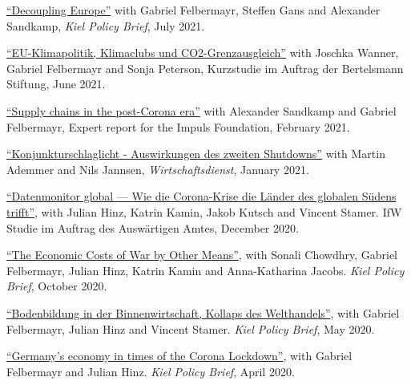 \documentclass{article}
\newlength{\cvlabelwidth}\setlength{\cvlabelwidth}{0.12\textwidth}
\newlength{\cvlabelgap}\setlength{\cvlabelgap}{5mm}
\newcommand{\cvmakelabel}[1]{%
    \smash{\parbox[t]{\cvlabelwidth}{\raggedright{\fontfamily{phv}\selectfont #1}}}}
\newenvironment{cvsection}[1]{%
    \par\medskip
    \begin{list}{}{%
        \setlength{\leftmargin}{\dimexpr\cvlabelwidth+\cvlabelgap\relax}%
        \setlength{\labelwidth}{\cvlabelwidth}%
        \setlength{\labelsep}{\cvlabelgap}%
        \setlength{\rightmargin}{0pt}%
        \setlength{\itemindent}{0pt}%
        \setlength{\listparindent}{0pt}%
        \setlength{\topsep}{0pt}%
        \setlength{\partopsep}{0pt}%
        \setlength{\parsep}{0.3em}%
        \setlength{\itemsep}{0pt}%
        \let\makelabel\cvmakelabel%
    }%
    \item[#1]\ignorespaces%
}{%
    \end{list}\medskip%
}
\begin{document}
\begin{cvsection}{COMMENTARY \& POLICY REPORTS}
    \href{https://www.ifw-kiel.de/publications/kiel-policy-briefs/2021/decoupling-europe-16271/}{``Decoupling Europe''} with Gabriel Felbermayr, Steffen Gans and Alexander Sandkamp, \textit{Kiel Policy Brief}, July 2021. \par
    \href{https://www.bertelsmann-stiftung.de/de/publikationen/publikation/did/eu-klimapolitik-klimaclubs-und-co2-grenzausgleich}{``EU-Klimapolitik, Klimaclubs und CO2-Grenzausgleich''} with Joschka Wanner, Gabriel Felbermayr and Sonja Peterson, Kurzstudie im Auftrag der Bertelsmann Stiftung, June 2021. \par
     \href{https://www.ifw-kiel.de/publications/policy-papers/2021/supply-chains-in-the-post-corona-era-in-german-15841/}{``Supply chains in the post-Corona era''} with Alexander Sandkamp and Gabriel Felbermayr, Expert report for the Impuls Foundation, February 2021. \par
    \href{https://www.wirtschaftsdienst.eu/inhalt/jahr/2021/heft/1/beitrag/auswirkungen-des-zweiten-shutdowns.html}{``Konjunkturschlaglicht - Auswirkungen des zweiten Shutdowns''} with Martin Ademmer and Nils Jannsen, \textit{Wirtschaftsdienst}, January 2021. \par
    \href{https://www.ifw-kiel.de/de/publikationen/policy-papers/2021/corona-krise-datenmonitor-global-0/}{``Datenmonitor global — Wie die Corona-Krise die Länder des globalen Südens trifft''}, with Julian Hinz, Katrin Kamin, Jakob Kutsch and Vincent Stamer. IfW Studie im Auftrag des Auswärtigen Amtes, December 2020. \par
    \href{https://www.ifw-kiel.de/publications/kiel-policy-briefs/2020/the-economic-costs-of-war-by-other-means-15301/}{``The Economic Costs of War by Other Means''}, with Sonali Chowdhry, Gabriel Felbermayr, Julian Hinz, Katrin Kamin and Anna-Katharina Jacobs. \textit{Kiel Policy Brief}, October 2020. \par
    \href{https://www.ifw-kiel.de/de/publikationen/kiel-policy-briefs/spezial/bodenbildung-in-der-binnenwirtschaft-kollaps-des-welthandels-14242/}{``Bodenbildung in der Binnenwirtschaft, Kollaps des Welthandels''}, with Gabriel Felbermayr, Julian Hinz and Vincent Stamer. \textit{Kiel Policy Brief}, May 2020. \par
    \href{https://www.ifw-kiel.de/publications/kiel-policy-briefs/special-edition/germanys-economy-in-times-of-the-corona-lockdown-14127/}{``Germany’s economy in times of the Corona Lockdown''}, with Gabriel Felbermayr and Julian Hinz. \textit{Kiel Policy Brief}, April 2020.
\end{cvsection}
\end{document}
